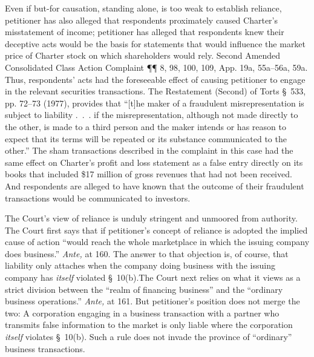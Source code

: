   Even if but-for causation, standing alone, is too weak to establish reliance, petitioner has also alleged that respondents proximately caused Charter's misstatement of income; petitioner has alleged that respondents knew their deceptive \newpage  acts would be the basis for statements that would influence the market price of Charter stock on which shareholders would rely. Second Amended Consolidated Class Action Complaint ¶¶ 8, 98, 100, 109, App. 19a, 55a--56a, 59a. Thus, respondents' acts had the foreseeable effect of causing petitioner to engage in the relevant securities transactions. The Restatement (Second) of Torts \S~533, pp. 72--73 (1977), provides that ``[t]he maker of a fraudulent misrepresentation is subject to liability .~.~. if the misrepresentation, although not made directly to the other, is made to a third person and the maker intends or has reason to expect that its terms will be repeated or its substance communicated to the other.'' The sham transactions described in the complaint in this case had the same effect on Charter's profit and loss statement as a false entry directly on its books that included \$17 million of gross revenues that had not been received. And respondents are alleged to have known that the outcome of their fraudulent transactions would be communicated to investors.

  The Court's view of reliance is unduly stringent and unmoored from authority. The Court first says that if petitioner's concept of reliance is adopted the implied cause of action ``would reach the whole marketplace in which the issuing company does business.'' \emph{Ante,} at 160. The answer to that objection is, of course, that liability only attaches when the company doing business with the issuing company has \emph{itself} violated \S~10(b).\footnotemark[4] The Court next relies on what it views as a strict division between the ``realm of financing business'' and the ``ordinary business operations.'' \emph{Ante,} at 161. But petitioner's position does not merge the two: A corporation engaging in a business transaction with a partner who transmits false information to the market is only liable where the \newpage  corporation \emph{itself} violates \S~10(b). Such a rule does not invade the province of ``ordinary'' business transactions.


